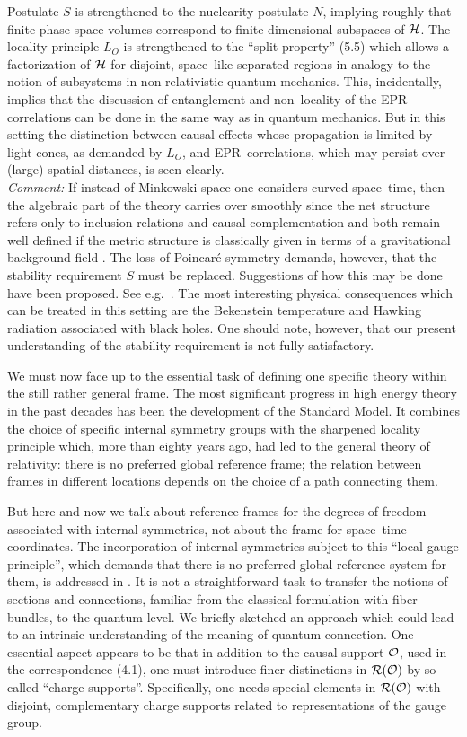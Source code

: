 Postulate $S$ is strengthened to the nuclearity postulate $N$, 
implying roughly that finite phase space volumes correspond to finite
dimensional subspaces of $\cal H$. The locality principle $L_O$
is strengthened to the ``split property'' (5.5) which allows a
factorization of $\cal H$ for disjoint, space--like separated 
regions in analogy to the notion of subsystems in non relativistic
quantum mechanics. This, incidentally, implies that the discussion
of entanglement and non--locality of the EPR--correlations can be 
done in the same way as in quantum mechanics. 
But in this setting the distinction between causal effects whose
propagation is limited by light cones, as demanded by  $L_O$, 
and EPR--correlations, which may persist over (large) spatial
distances,  is seen clearly. \\[1mm]
{\it Comment:} If instead of Minkowski space one considers 
curved space--time, then the algebraic part of the theory carries over
smoothly since the net structure refers only to inclusion relations
and causal complementation and both remain well defined if the metric
structure is classically given in terms of a gravitational background
field \cite{Di}. The loss of Poincar\'e symmetry demands, however, 
that the stability requirement $S$ must be replaced. Suggestions of 
how this may be done have been proposed. See e.g.\
\cite{Wa,BrFrKo,Ha,BuDrFlSu}. 
The most interesting physical consequences which can be treated 
in this setting are the 
Bekenstein temperature and Hawking radiation associated with black 
holes. One should note, 
however, that our present understanding of the stability requirement 
is not fully satisfactory.

We must now face up to the essential task of defining one specific
theory within the still rather general frame. The most significant
progress in high energy theory in the past decades has been the 
development of the Standard Model. It combines the choice of specific
internal symmetry groups with the sharpened locality principle which,
more than eighty years ago, had led to the general theory of
relativity: there is no preferred global reference frame; the relation
between frames in different locations depends on the choice of 
a path connecting them.

But here and now we talk about reference frames for the degrees of 
freedom associated with internal symmetries, not about the frame for 
space--time coordinates. The incorporation of internal symmetries 
subject to this ``local gauge principle'', which demands that there is
no preferred global reference system for them, 
is addressed in \secsev. It is not a straightforward task to
transfer the notions of sections and connections, familiar from the 
classical formulation with fiber bundles, to the quantum level.
We briefly sketched an approach which could lead to an intrinsic
understanding of the meaning of quantum connection. One essential
aspect appears to be that in addition to the causal support ${\cal  O}$, 
used in the correspondence (4.1), one must introduce finer
distinctions in ${\cal R} ({\cal O})$ by so--called ``charge 
supports''. Specifically, one needs special elements in 
${\cal R} ({\cal O})$
with disjoint, complementary charge supports related to representations
of the gauge group. 

